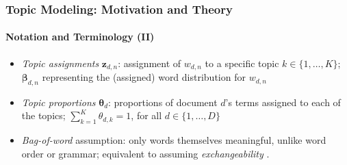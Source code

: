 \documentclass[xcolor=dvipsnames]{beamer}
\begin{document}
\begin{frame}
\frametitle{Topic Modeling: Motivation and Theory}
\framesubtitle{Notation and Terminology (II)}
\begin{itemize}
\item \textit{Topic assignments} $\boldsymbol{z}_{d,n}$: assignment of $w_{d,n}$ to a specific topic $k \in \{1,\dots,K\}$; $\boldsymbol{\beta}_{d,n}$ representing the (assigned) word distribution for $w_{d,n}$
\item \textit{Topic proportions} $\boldsymbol{\theta}_d$: proportions of document $d$'s terms assigned to each of the topics; $\sum_{k=1}^{K}\theta_{d,k}=1$, for all $d \in \{1,\dots,D\}$
\item \textit{Bag-of-word} assumption: only words themselves meaningful, unlike word order or grammar; equivalent to assuming \textit{exchangeability} \cite{aldous1985exchangeability}.
\end{itemize}
\end{frame}
\end{document}

